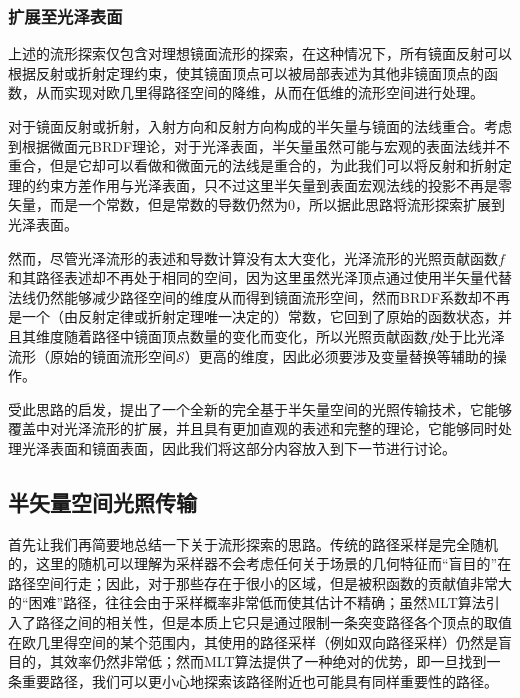 \subsubsection{扩展至光泽表面}\label{sec:mlt-manifold-specular}
上述的流形探索仅包含对理想镜面流形的探索，在这种情况下，所有镜面反射可以根据反射或折射定理约束，使其镜面顶点可以被局部表述为其他非镜面顶点的函数，从而实现对欧几里得路径空间的降维，从而在低维的流形空间进行处理。

对于镜面反射或折射，入射方向和反射方向构成的半矢量与镜面的法线重合。考虑到根据微面元BRDF理论，对于光泽表面，半矢量虽然可能与宏观的表面法线并不重合，但是它却可以看做和微面元的法线是重合的，为此我们可以将反射和折射定理的约束方差作用与光泽表面，只不过这里半矢量到表面宏观法线的投影不再是零矢量，而是一个常数，但是常数的导数仍然为0，所以\cite{a:ManifoldExplorationAMarkovChainMonteCarloTechniqueforRenderingSceneswithDifficultSpecularTransport}据此思路将流形探索扩展到光泽表面。

然而，尽管光泽流形的表述和导数计算没有太大变化，光泽流形的光照贡献函数$f$和其路径表述却不再处于相同的空间，因为这里虽然光泽顶点通过使用半矢量代替法线仍然能够减少路径空间的维度从而得到镜面流形空间，然而BRDF系数却不再是一个（由反射定律或折射定理唯一决定的）常数，它回到了原始的函数状态，并且其维度随着路径中镜面顶点数量的变化而变化，所以光照贡献函数$f$处于比光泽流形（原始的镜面流形空间$\mathcal{S}$）更高的维度，因此必须要涉及变量替换等辅助的操作。

\cite{a:TheNaturalConstraintRepresentationofthePathSpaceforEfficientLightTransportSimulation}受此思路的启发，提出了一个全新的完全基于半矢量空间的光照传输技术，它能够覆盖\cite{a:ManifoldExplorationAMarkovChainMonteCarloTechniqueforRenderingSceneswithDifficultSpecularTransport}中对光泽流形的扩展，并且具有更加直观的表述和完整的理论，它能够同时处理光泽表面和镜面表面，因此我们将这部分内容放入到下一节进行讨论。





\subsection{半矢量空间光照传输}\label{sec:mlt-hslt}
首先让我们再简要地总结一下关于流形探索的思路。传统的路径采样是完全随机的，这里的随机可以理解为采样器不会考虑任何关于场景的几何特征而“盲目的”在路径空间行走；因此，对于那些存在于很小的区域，但是被积函数的贡献值非常大的“困难”路径，往往会由于采样概率非常低而使其估计不精确；虽然MLT算法引入了路径之间的相关性，但是本质上它只是通过限制一条突变路径各个顶点的取值在欧几里得空间的某个范围内，其使用的路径采样（例如双向路径采样）仍然是盲目的，其效率仍然非常低；然而MLT算法提供了一种绝对的优势，即一旦找到一条重要路径，我们可以更小心地探索该路径附近也可能具有同样重要性的路径。


